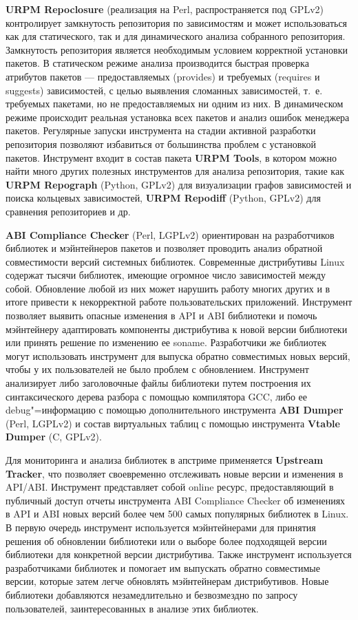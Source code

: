\documentclass[10pt, a5paper]{article}
\begin{document}
\textbf{URPM Repoclosure} (реализация на Perl, распространяется под GPLv2) контролирует замкнутость репозитория по зависимостям и может использоваться как для статического, так и для динамического анализа собранного репозитория. Замкнутость репозитория является необходимым условием корректной установки пакетов. В статическом режиме анализа производится быстрая проверка атрибутов пакетов — предоставляемых (provides) и требуемых (requires и suggests) зависимостей, с целью выявления сломанных зависимостей, т.~е. требуемых пакетами, но не предоставляемых ни одним из них. В динамическом режиме происходит реальная установка всех пакетов и анализ ошибок менеджера пакетов. Регулярные запуски инструмента на стадии активной разработки репозитория позволяют избавиться от большинства проблем с установкой пакетов. Инструмент входит в состав пакета \textbf{URPM Tools}, в котором можно найти много других полезных инструментов для анализа репозитория, такие как \textbf{URPM Repograph} (Python, GPLv2) для визуализации графов зависимостей и поиска кольцевых зависимостей, \textbf{URPM Repodiff} (Python, GPLv2) для сравнения репозиториев и др.

\textbf{ABI Compliance Checker} (Perl, LGPLv2) ориентирован на разработчиков библиотек и мэйнтейнеров пакетов и позволяет проводить анализ обратной совместимости версий системных библиотек. Современные дистрибутивы Linux содержат тысячи библиотек, имеющие огромное число зависимостей между собой. Обновление любой из них может нарушить работу многих других и в итоге привести к некорректной работе пользовательских приложений. Инструмент позволяет выявить опасные изменения в API и ABI библиотеки и помочь мэйнтейнеру адаптировать компоненты дистрибутива к новой версии библиотеки или принять решение по изменению ее soname. Разработчики же библиотек могут использовать инструмент для выпуска обратно совместимых новых версий, чтобы у их пользователей не было проблем с обновлением. Инструмент анализирует либо заголовочные файлы библиотеки путем построения их синтаксического дерева разбора с помощью компилятора GCC, либо ее debug"=информацию с помощью дополнительного инструмента \textbf{ABI Dumper} (Perl, LGPLv2) и состав виртуальных таблиц с помощью инструмента \textbf{Vtable Dumper} (C, GPLv2).

Для мониторинга и анализа библиотек в апстриме применяется \textbf{Upstream Tracker}, что позволяет своевременно отслеживать новые версии и изменения в API/ABI. Инструмент представляет собой online ресурс, предоставляющий в публичный доступ отчеты инструмента ABI Compliance Checker об изменениях в API и ABI новых версий более чем 500 самых популярных библиотек в Linux. В первую очередь инструмент используется мэйнтейнерами для принятия решения об обновлении библиотеки или о выборе более подходящей версии библиотеки для конкретной версии дистрибутива. Также инструмент используется разработчиками библиотек и помогает им выпускать обратно совместимые версии, которые затем легче обновлять мэйнтейнерам дистрибутивов. Новые библиотеки добавляются незамедлительно и безвозмездно по запросу пользователей, заинтересованных в анализе этих библиотек.
\end{document}

